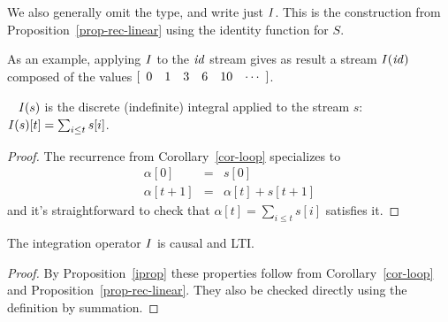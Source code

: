 \noindent
We also generally omit the type, and write just $\I$.
This is the construction from Proposition~\ref{prop-rec-linear} 
using the identity function for $S$.

\begin{center}
\end{center}

As an example, applying $\I$ to the $\mathit{id}$ stream gives as result
a stream $\mathit{I}(\mathit{id})$ composed of the values $\sv{0 1 3 6 10}$.

\begin{proposition}~\label{iprop}
$\mathit{I}(s)$ is the discrete (indefinite) integral applied to the stream $s$: 
$\mathit{I}(s)[t] = \sum_{i \leq t} s[i]$.
\end{proposition}
\begin{proof} The recurrence from Corollary~\ref{cor-loop} specializes to
\begin{eqnarray*}
\alpha[0]  & = & s[0]\\
\alpha[t+1] & = & \alpha[t] + s[t+1]
\end{eqnarray*}
and it's straightforward to check that $\alpha[t]= \sum_{i \leq t} s[i]$ satisfies 
it.
\end{proof}

\begin{proposition}[Properties of $\I$] 
\label{prop-integ-properties}
The integration operator $\I$ is causal and LTI.
\end{proposition}
\begin{proof}
By Proposition~\ref{iprop} these properties follow from Corollary~\ref{cor-loop} and Proposition~\ref{prop-rec-linear}.  They also be checked directly using
the definition by summation.
\end{proof}


